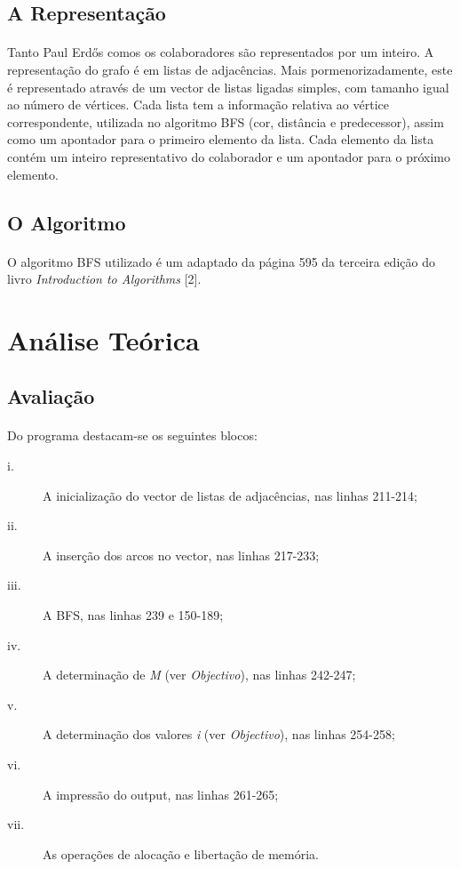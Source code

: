 \documentclass[12pt, a4paper]{article}
\begin{document}
\subsection{A Representação}
\paragraph{}
Tanto Paul Erdős comos os colaboradores são representados por um inteiro.
A representação do grafo é em listas de adjacências. Mais pormenorizadamente,
este é representado através de um vector de listas ligadas simples, com tamanho
igual ao número de  vértices. Cada lista tem a informação relativa ao vértice
correspondente, utilizada no algoritmo BFS (cor, distância e predecessor), assim
como um apontador para o primeiro elemento da lista. Cada elemento da lista
contém um inteiro representativo do colaborador e um apontador para o próximo
elemento.

\subsection{O Algoritmo}
\paragraph{}
O algoritmo BFS utilizado é um adaptado da página 595 da terceira edição do
livro \textit{Introduction to Algorithms} [2].


\section{Análise Teórica}
\subsection{Avaliação}
\paragraph{}
Do programa destacam-se os seguintes blocos:

\begin{description}
    \item[i.] A inicialização do vector de listas de adjacências, nas linhas
        211-214;
    \item[ii.] A inserção dos arcos no vector, nas linhas 217-233;
    \item[iii.] A BFS, nas linhas 239 e 150-189;
    \item[iv.] A determinação de \textit{M} (ver \textit{Objectivo}), nas linhas
        242-247;
    \item[v.] A determinação dos valores \textit{i} (ver \textit{Objectivo}), nas linhas
        254-258;
    \item[vi.] A impressão do output, nas linhas 261-265;
    \item[vii.] As operações de alocação e libertação de memória.
\end{description}
\end{document}
